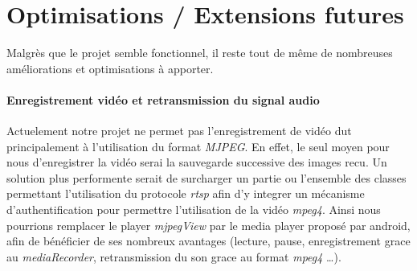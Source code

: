 \chapter{Optimisations / Extensions futures}
Malgrès que le projet semble fonctionnel, il reste tout de même de nombreuses
améliorations et optimisations à apporter. 

\subsubsection{Enregistrement vidéo et retransmission du signal audio}
Actuelement notre projet ne permet pas l'enregistrement de vidéo dut
principalement à l'utilisation du format \textit{MJPEG}. En effet, le seul moyen
pour nous d'enregistrer la vidéo serai la sauvegarde successive des images recu.
Un solution plus performente serait de surcharger un partie ou l'ensemble des
classes permettant l'utilisation du protocole \textit{rtsp} afin d'y integrer un
mécanisme d'authentification pour permettre l'utilisation de la vidéo
\textit{mpeg4}. Ainsi nous pourrions remplacer le player \textit{mjpegView} par
le media player proposé par android, afin de bénéficier de ses nombreux
avantages (lecture, pause, enregistrement grace au \textit{mediaRecorder},
retransmission du son grace au format \textit{mpeg4} \ldots).

